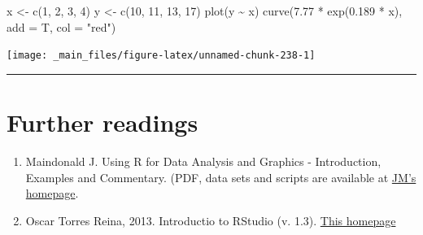 \documentclass[a4paper,12pt,oneside]{book}
\providecommand{\tightlist}{%
  \setlength{\itemsep}{0pt}\setlength{\parskip}{0pt}}
\newenvironment{Shaded}{\begin{snugshade}}{\end{snugshade}}
\newcommand{\DecValTok}[1]{#1}
\newcommand{\FloatTok}[1]{#1}
\newcommand{\SpecialCharTok}[1]{#1}
\newcommand{\StringTok}[1]{#1}
\newcommand{\OtherTok}[1]{#1}
\newcommand{\FunctionTok}[1]{#1}
\newcommand{\AttributeTok}[1]{#1}
\newcommand{\NormalTok}[1]{#1}
\begin{document}
\begin{Shaded}
\begin{Highlighting}[]
\NormalTok{x  }\OtherTok{\textless{}{-}}  \FunctionTok{c}\NormalTok{(}\DecValTok{1}\NormalTok{, }\DecValTok{2}\NormalTok{, }\DecValTok{3}\NormalTok{, }\DecValTok{4}\NormalTok{)}
\NormalTok{y  }\OtherTok{\textless{}{-}}  \FunctionTok{c}\NormalTok{(}\DecValTok{10}\NormalTok{, }\DecValTok{11}\NormalTok{, }\DecValTok{13}\NormalTok{, }\DecValTok{17}\NormalTok{)}
\FunctionTok{plot}\NormalTok{(y }\SpecialCharTok{\textasciitilde{}}\NormalTok{ x)}
\FunctionTok{curve}\NormalTok{(}\FloatTok{7.77} \SpecialCharTok{*} \FunctionTok{exp}\NormalTok{(}\FloatTok{0.189} \SpecialCharTok{*}\NormalTok{ x), }\AttributeTok{add =}\NormalTok{ T, }\AttributeTok{col =} \StringTok{"red"}\NormalTok{)}
\end{Highlighting}
\end{Shaded}

\texttt{[image: \_main\_files/figure-latex/unnamed-chunk-238-1]}

\begin{center}\rule{0.5\linewidth}{0.5pt}\end{center}

\hypertarget{further-readings-12}{%
\section{Further readings}\label{further-readings-12}}

\begin{enumerate}
\def\labelenumi{\arabic{enumi}.}
\tightlist
\item
  Maindonald J. Using R for Data Analysis and Graphics - Introduction, Examples and Commentary. (PDF, data sets and scripts are available at \href{https://cran.r-project.org/doc/contrib/usingR.pdff}{JM's homepage}.
\item
  Oscar Torres Reina, 2013. Introductio to RStudio (v. 1.3). \href{https://dss.princeton.edu/training/RStudio101.pdf}{This homepage}
\end{enumerate}
\end{document}
